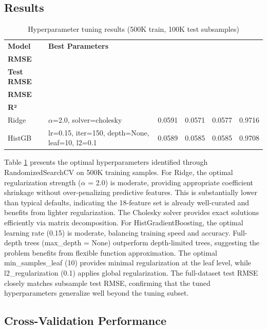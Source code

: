 \documentclass[12pt,a4paper]{article}
\begin{document}
\subsection{Results}

\begin{table}[H]
\centering
\caption{Hyperparameter tuning results (500K train, 100K test subsamples)}
\label{tab:tuning_results}
\small
\begin{tabular}{lp{5cm}rrrr}
\toprule
\textbf{Model} & \textbf{Best Parameters} & \thead{\textbf{CV}\\\textbf{RMSE}} & \thead{\textbf{Subsample}\\\textbf{Test RMSE}} & \thead{\textbf{Full Test}\\\textbf{RMSE}} & \thead{\textbf{Full Test}\\\textbf{R²}} \\
\midrule
Ridge & $\alpha$=2.0, solver=cholesky & 0.0591 & 0.0571 & 0.0577 & 0.9716 \\
HistGB & lr=0.15, iter=150, depth=None, leaf=10, l2=0.1 & 0.0589 & 0.0585 & 0.0585 & 0.9708 \\
\bottomrule
\end{tabular}
\end{table}

Table \ref{tab:tuning_results} presents the optimal hyperparameters identified through RandomizedSearchCV on 500K training samples. For Ridge, the optimal regularization strength ($\alpha$ = 2.0) is moderate, providing appropriate coefficient shrinkage without over-penalizing predictive features. This is substantially lower than typical defaults, indicating the 18-feature set is already well-curated and benefits from lighter regularization. The Cholesky solver provides exact solutions efficiently via matrix decomposition. For HistGradientBoosting, the optimal learning rate (0.15) is moderate, balancing training speed and accuracy. Full-depth trees (max\_depth = None) outperform depth-limited trees, suggesting the problem benefits from flexible function approximation. The optimal min\_samples\_leaf (10) provides minimal regularization at the leaf level, while l2\_regularization (0.1) applies global regularization. The full-dataset test RMSE closely matches subsample test RMSE, confirming that the tuned hyperparameters generalize well beyond the tuning subset.

\subsection{Cross-Validation Performance}
\end{document}
